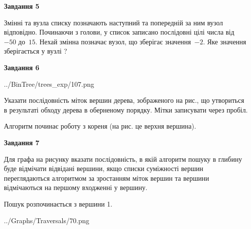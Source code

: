 \documentclass[12pt, ukrainian]{article}
\begin{document}
{\begin {large}
{\begin {center}\textbf{Завдання 5}\end {center}}\par
Змінні  та  вузла списку позначають наступний та попередній за ним вузол відповідно. Починаючи з голови, у список записано послідовні цілі числа від~$-50$ до~$15$. Нехай змінна  позначає вузол, що зберігає значення~$-2$.
Яке значення зберігається у вузлі  ?\par
\newpage

{\begin {center}\textbf{Завдання 6}\end {center}}\par

\begin{center}
	{../BinTree/trees_exp/107.png}
\end{center}
Указати послідовність міток вершин дерева, зображеного на рис., що утвориться в результаті обходу дерева в оберненому порядку. Мітки записувати через пробіл.\par Алгоритм починає роботу з кореня (на рис. це верхня вершина).\par
\newpage

{\begin {center}\textbf{Завдання 7}\end {center}}\par
Для графа на рисунку вказати послідовність, в якій алгоритм пошуку в глибину буде відмічати відвідані вершини, якщо списки суміжності вершин переглядаються алгоритмом за зростанням міток вершин та вершини відмічаються на першому вход\-женні у вершину.\par
Пошук розпочинається з вершини 1.\par

\begin{center}
	{../Graphs/Traversals/70.png}
\end{center}\par
\newpage


\end{large}}
\end{document}

